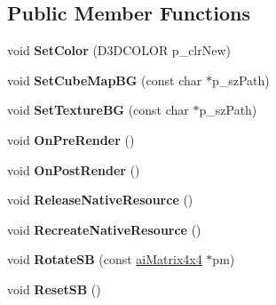 \subsection*{Public Member Functions}
\begin{DoxyCompactItemize}
\item 
\hypertarget{class_c_background_painter_a1d975e818420318026460ab39ffe4b19}{void {\bfseries Set\+Color} (D3\+D\+C\+O\+L\+O\+R p\+\_\+clr\+New)}\label{class_c_background_painter_a1d975e818420318026460ab39ffe4b19}

\item 
\hypertarget{class_c_background_painter_a75bceb352643a4b5c08a976cb77a36b2}{void {\bfseries Set\+Cube\+Map\+B\+G} (const char $\ast$p\+\_\+sz\+Path)}\label{class_c_background_painter_a75bceb352643a4b5c08a976cb77a36b2}

\item 
\hypertarget{class_c_background_painter_af0d8fa6cd05d5553cc157c894cea931a}{void {\bfseries Set\+Texture\+B\+G} (const char $\ast$p\+\_\+sz\+Path)}\label{class_c_background_painter_af0d8fa6cd05d5553cc157c894cea931a}

\item 
\hypertarget{class_c_background_painter_a4521d120c292c42cc99e91c533f2eac4}{void {\bfseries On\+Pre\+Render} ()}\label{class_c_background_painter_a4521d120c292c42cc99e91c533f2eac4}

\item 
\hypertarget{class_c_background_painter_ae79c3b36868c45fd06793d667351ce53}{void {\bfseries On\+Post\+Render} ()}\label{class_c_background_painter_ae79c3b36868c45fd06793d667351ce53}

\item 
\hypertarget{class_c_background_painter_a8516de85bfe4a5398735c47ea59f7d96}{void {\bfseries Release\+Native\+Resource} ()}\label{class_c_background_painter_a8516de85bfe4a5398735c47ea59f7d96}

\item 
\hypertarget{class_c_background_painter_aec75a72d73202fd577820effcf5bf718}{void {\bfseries Recreate\+Native\+Resource} ()}\label{class_c_background_painter_aec75a72d73202fd577820effcf5bf718}

\item 
\hypertarget{class_c_background_painter_a10a6d1d7107a269930534e6cebfa5523}{void {\bfseries Rotate\+S\+B} (const \hyperlink{structai_matrix4x4}{ai\+Matrix4x4} $\ast$pm)}\label{class_c_background_painter_a10a6d1d7107a269930534e6cebfa5523}

\item 
\hypertarget{class_c_background_painter_add8f2c27eb9de983c25ba56603838b9f}{void {\bfseries Reset\+S\+B} ()}\label{class_c_background_painter_add8f2c27eb9de983c25ba56603838b9f}


\end{DoxyCompactItemize}
